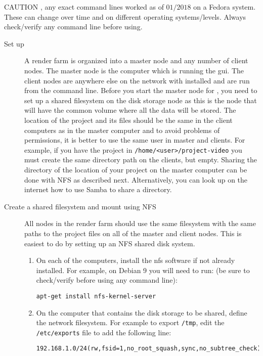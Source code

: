 {\color{red} CAUTION }, any exact command lines worked as of $01/2018$ on a Fedora system.  These can change over time and on different operating systems/levels.  Always check/verify any command line before using.

\begin{description}
    \item[Set up \CGG{}] A \CGG{} render farm is organized into a master node and any number of client nodes.  The master node is the computer which is running the gui.  The client nodes are anywhere else on the network with \CGG{} installed and are run from the command line.  Before you start the master node for \CGG{}, you need to set up a shared filesystem on the disk storage node as this is the node that will have the common volume where all the data will be stored.
    The location of the project and its files should be the same in the client computers as in the master computer and to avoid problems of permissions, it is better to use the same user in master and clients.
    For example, if you have the project in \texttt{/home/<user>/project-video} you must create the same directory path on the clients, but empty.  Sharing the directory of the location of your project on the master computer can be done with NFS as described next.  Alternatively, you can look up on the internet how to use Samba to share a directory.
    \item[Create a shared filesystem and mount using NFS] All nodes in the render farm should use the same filesystem with the same paths to the project files on all of the master and client nodes.  This is easiest to do by setting up an NFS shared disk system.
    \begin{enumerate}
        \item On each of the computers, install the nfs software if not already installed.  For example, on Debian 9
        you will need to run: (be sure to check/verify before using any command line):
        \begin{lstlisting}[style=sh]
apt-get install nfs-kernel-server
        \end{lstlisting}
        \item On the computer that contains the disk storage to be shared, define the network filesystem.  For
        example to export \texttt{/tmp}, edit the \texttt{/etc/exports} file to add the following line:
        \begin{lstlisting}[style=sh]
192.168.1.0/24(rw,fsid=1,no_root_squash,sync,no_subtree_check)
        \end{lstlisting}

\end{enumerate}
\end{description}
